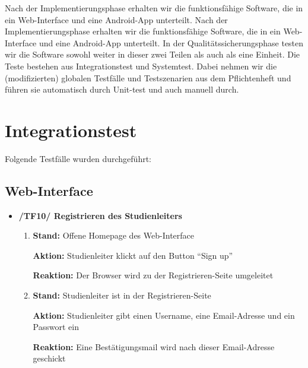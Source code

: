 \documentclass[a4paper]{scrreprt}
\begin{document}
        Nach der Implementierungsphase erhalten wir die funktionsf\"ahige Software, die in ein Web-Interface und eine Android-App unterteilt.
        Nach der Implementierungsphase erhalten wir die funktionsf\"ahige Software, die in ein Web-Interface und eine Android-App unterteilt. In der Qualit\"atssicherungsphase testen wir die Software sowohl weiter in dieser zwei Teilen als auch als eine Einheit. Die Teste bestehen aus Integrationstest und Systemtest. Dabei nehmen wir die (modifizierten) globalen Testf\"alle und Testszenarien aus dem Pflichtenheft und f\"uhren sie automatisch durch Unit-test und auch manuell durch.



			

      \newpage
      \chapter{Integrationstest}
      Folgende Testf\"alle wurden durchgef\"uhrt:


	      \section{Web-Interface}
		      \begin{itemize}
		          \item \textbf{/TF10/ Registrieren des Studienleiters}
		          \begin{enumerate}
		               \item \par \textbf{Stand: }Offene Homepage des Web-Interface
		                \par \textbf{Aktion: }Studienleiter klickt auf den Button ``Sign up''
		                \par \textbf{Reaktion: }Der Browser wird zu der Registrieren-Seite umgeleitet
			            \item \par \textbf{Stand: }Studienleiter ist in der Registrieren-Seite
		                \par \textbf{Aktion: }Studienleiter gibt einen Username, eine Email-Adresse und ein Passwort ein
		                \par \textbf{Reaktion: }Eine Bestätigungsmail wird nach dieser Email-Adresse geschickt
		           \end{enumerate}

		       \end{itemize}
	
	
\end{document}
